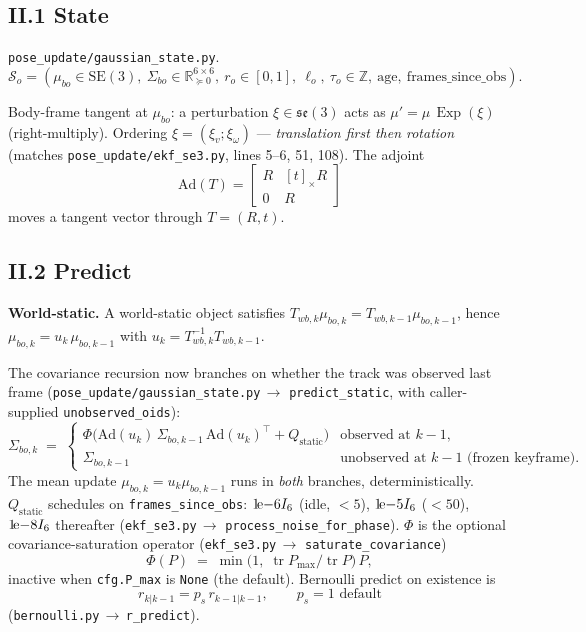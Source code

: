 \documentclass[11pt]{article}
\DeclareMathOperator{\Tr}{tr}
\DeclareMathOperator{\Exp}{Exp}
\newcommand{\R}{\mathbb{R}}
\newcommand{\SE}{\mathrm{SE}(3)}
\newcommand{\se}{\mathfrak{se}(3)}
\newcommand{\Ad}{\mathrm{Ad}}
\newcommand{\file}[1]{\texttt{#1}}
\begin{document}
\subsection*{II.1 State}

\file{pose\_update/gaussian\_state.py}.
$$\mathcal{S}_o = (\mu_{bo}\in\SE,\ \Sigma_{bo}\in\R^{6\times 6}_{\succeq 0},\
  r_o\in[0,1],\ \ell_o,\ \tau_o\in\mathbb{Z},\ \text{age},\ \text{frames\_since\_obs}).$$

Body-frame tangent at $\mu_{bo}$: a perturbation $\xi\in\se$ acts as
$\mu' = \mu\,\Exp(\xi)$ (right-multiply). Ordering
$\xi=(\xi_v;\xi_\omega)$ — \emph{translation first then rotation} (matches
\file{pose\_update/ekf\_se3.py}, lines 5--6, 51, 108). The adjoint
$$\Ad(T) = \begin{bmatrix} R & [t]_\times R \\ 0 & R \end{bmatrix}$$
moves a tangent vector through $T=(R,t)$.

\subsection*{II.2 Predict}

\textbf{World-static.} A world-static object satisfies
$T_{wb,k}\mu_{bo,k} = T_{wb,k-1}\mu_{bo,k-1}$, hence
$\mu_{bo,k} = u_k\,\mu_{bo,k-1}$ with
$u_k = T_{wb,k}^{-1}T_{wb,k-1}$.

The covariance recursion now branches on whether the track was
observed last frame (\file{pose\_update/gaussian\_state.py}\,$\to$
\texttt{predict\_static}, with caller-supplied
\texttt{unobserved\_oids}):
\begin{equation}\label{eq:proc}
\Sigma_{bo,k} \;=\;
\begin{cases}
\Phi\!\bigl(\Ad(u_k)\,\Sigma_{bo,k-1}\,\Ad(u_k)^\top + Q_{\text{static}}\bigr) & \text{observed at } k{-}1, \\[2pt]
\Sigma_{bo,k-1} & \text{unobserved at } k{-}1 \text{ (frozen keyframe)}.
\end{cases}
\end{equation}
The mean update $\mu_{bo,k}=u_k\mu_{bo,k-1}$ runs in \emph{both}
branches, deterministically. $Q_{\text{static}}$ schedules on
\texttt{frames\_since\_obs}: $1\!{\rm e}{-6}I_6$ (idle, $<5$),
$1\!{\rm e}{-5}I_6$ ($<50$), $1\!{\rm e}{-8}I_6$ thereafter
(\file{ekf\_se3.py}\,$\to$ \texttt{process\_noise\_for\_phase}).
$\Phi$ is the optional covariance-saturation operator
(\file{ekf\_se3.py}\,$\to$ \texttt{saturate\_covariance})
\begin{equation}\label{eq:phi}
\Phi(P) \;=\; \min\!\bigl(1,\;\Tr P_{\max}/\Tr P\bigr)\,P,
\end{equation}
inactive when \texttt{cfg.P\_max} is \texttt{None} (the default).
Bernoulli predict on existence is
\begin{equation}\label{eq:bern_pred_r}
r_{k|k-1} = p_s\,r_{k-1|k-1}, \qquad p_s = 1 \text{ default}
\end{equation}
(\file{bernoulli.py}\,$\to$\,\texttt{r\_predict}).
\end{document}
